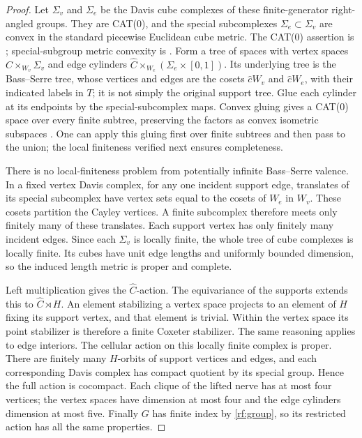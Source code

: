\begin{proof}
Let $\Sigma_v$ and $\Sigma_e$ be the Davis cube complexes of these
finite-generator right-angled groups.  They are CAT(0), and the special
subcomplexes $\Sigma_e\subset\Sigma_v$ are convex in the standard
piecewise Euclidean cube metric.  The CAT(0) assertion is
\cite[Theorem~12.2.1(i)]{Davis}; special-subgroup metric convexity is
\cite[Appendix, Proposition~A.2]{Swiatkowski}.
Form a tree of spaces with vertex spaces
$\widehat C\times_{W_v}\Sigma_v$ and edge cylinders
$\widehat C\times_{W_e}(\Sigma_e\times[0,1])$.
Its underlying tree is the Bass--Serre tree, whose vertices and edges
are the cosets $\widehat cW_v$ and $\widehat cW_e$, with their
indicated labels in $T$; it is not simply the original support tree.
Glue each cylinder at its endpoints by the special-subcomplex maps.
Convex gluing gives a CAT(0) space over every finite subtree, preserving
the factors as convex isometric subspaces
\cite[Theorem~II.11.1 and Remark~II.11.2]{BH}.
One can apply this gluing first over finite subtrees and then pass
to the union; the local finiteness verified next ensures completeness.

There is no local-finiteness problem from potentially infinite
Bass--Serre valence.  In a fixed vertex Davis complex, for any one
incident support edge, translates of its special subcomplex have
vertex sets equal to the cosets of $W_e$ in $W_v$.  These cosets
partition the Cayley vertices.  A finite subcomplex therefore meets
only finitely many of these translates.  Each support vertex has
only finitely many incident edges.  Since each $\Sigma_v$ is locally
finite, the whole tree of cube complexes is locally finite.  Its
cubes have unit edge lengths and uniformly bounded dimension, so
the induced length metric is proper and complete.

Left multiplication gives the $\widehat C$-action.  The equivariance
of the supports extends this to $\widehat C\rtimes H$.  An element
stabilizing a vertex space projects to an element of $H$ fixing its
support vertex, and that element is trivial.  Within the vertex
space its point stabilizer is therefore a finite Coxeter stabilizer.
The same reasoning applies to edge interiors.  The cellular action
on this locally finite complex is proper.  There are finitely many
$H$-orbits of support vertices and edges, and each corresponding
Davis complex has compact quotient by its special group.  Hence
the full action is cocompact.  Each clique of the lifted nerve has
at most four vertices; the vertex spaces have dimension at most four
and the edge cylinders dimension at most five.  Finally $G$ has finite
index by \eqref{rf:group}, so its restricted action has all the same
properties.
\end{proof}


